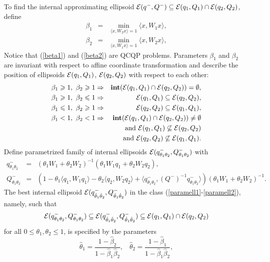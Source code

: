 To find the internal approximating ellipsoid
$\EE(q^-,Q^-)\subseteq\EE(q_1,Q_1)\cap\EE(q_2,Q_2)$, define
\begin{eqnarray}
\beta_1 & = &
\min_{\langle x,W_2x\rangle=1}\langle x,W_1x\rangle, \label{beta1}\\
\beta_2 & = & \min_{\langle x,W_1x\rangle=1}\langle x,W_2x\rangle, \label{beta2}
\end{eqnarray}
Notice that (\ref{beta1}) and (\ref{beta2}) are QCQP problems.
Parameters $\beta_1$ and $\beta_2$ are invariant with respect to affine
coordinate transformation and describe the position of ellipsoids
$\EE(q_1,Q_1)$, $\EE(q_2,Q_2)$ with respect to each other:
\begin{eqnarray*}
\beta_1\geq1,~\beta_2\geq1 & \Rightarrow &
{\bf int}(\EE(q_1,Q_1)\cap\EE(q_2,Q_2))=\emptyset, \\
\beta_1\geq1,~\beta_2\leq1 & \Rightarrow & \EE(q_1,Q_1)\subseteq\EE(q_2,Q_2), \\
\beta_1\leq1,~\beta_2\geq1 & \Rightarrow & \EE(q_2,Q_2)\subseteq\EE(q_1,Q_1), \\
\beta_1<1,~\beta_2<1 & \Rightarrow &
{\bf int}(\EE(q_1,Q_1)\cap\EE(q_2,Q_2))\neq\emptyset \\
& & \mbox{and} ~ \EE(q_1,Q_1)\not\subseteq\EE(q_2,Q_2) \\
& & \mbox{and} ~ \EE(q_2,Q_2)\not\subseteq\EE(q_1,Q_1).
\end{eqnarray*}
Define parametrized family of internal ellipsoids
$\EE(q^-_{\theta_1\theta_2},Q^-_{\theta_1\theta_2})$ with
\begin{eqnarray}
q^-_{\theta_1\theta_2} & = & (\theta_1W_1 +
\theta_2W_2)^{-1}(\theta_1W_1q_1 + \theta_2W_2q_2), \label{paramell1} \\
Q^-_{\theta_1\theta_2} & = & (1 - \theta_1\langle q_1,W_1q_1\rangle -
\theta_2\langle q_2,W_2q_2\rangle +
\langle q^-_{\theta_1\theta_2},(Q^-)^{-1}q^-_{\theta_1\theta_2}\rangle)
(\theta_1W_1 + \theta_2W_2)^{-1} .\label{paramell2}
\end{eqnarray}
The best internal ellipsoid
$\EE(q^-_{\hat{\theta}_1\hat{\theta}_2},Q^-_{\hat{\theta}_1\hat{\theta}_2})$
in the class (\ref{paramell1}-\ref{paramell2}), namely, such that
\[ \EE(q^-_{{\theta}_1{\theta}_2},Q^-_{{\theta}_1{\theta}_2})\subseteq
\EE(q^-_{\hat{\theta}_1\hat{\theta}_2},Q^-_{\hat{\theta}_1\hat{\theta}_2})
\subseteq \EE(q_1,Q_1)\cap\EE(q_2,Q_2) \]
for all $0\leq\theta_1,\theta_2\leq1$, is specified by the parameters
\begin{equation}
\hat{\theta}_1 = \frac{1-\hat{\beta}_2}{1-\hat{\beta}_1\hat{\beta}_2}, ~~~~
\hat{\theta}_2 = \frac{1-\hat{\beta}_1}{1-\hat{\beta}_1\hat{\beta}_2},
\label{thetapar}
\end{equation}
